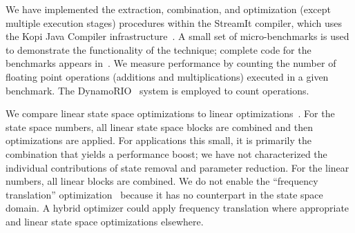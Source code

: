 \label{sec:results}

We have implemented the extraction, combination, and optimization
(except multiple execution stages) procedures within the StreamIt
compiler, which uses the Kopi Java Compiler
infrastructure~\cite{kopi}.  A small set of micro-benchmarks is used
to demonstrate the functionality of the technique; complete code for
the benchmarks appears in~\cite[pp.67-93]{Agrawal04}.  We measure
performance by counting the number of floating point operations
(additions and multiplications) executed in a given benchmark.  The
DynamoRIO~\cite{dynamo,dynamorio} system is employed to count
operations.

We compare linear state space optimizations to linear
optimizations~\cite{Lamb}.  For the state space numbers, all linear
state space blocks are combined and then optimizations are applied.
For applications this small, it is primarily the combination that
yields a performance boost; we have not characterized the individual
contributions of state removal and parameter reduction.  For the
linear numbers, all linear blocks are combined.  We do not enable the
``frequency translation'' optimization~\cite{Lamb} because it has no
counterpart in the state space domain.  A hybrid optimizer could apply
frequency translation where appropriate and linear state space
optimizations elsewhere.


